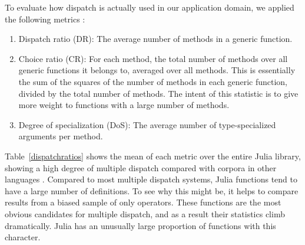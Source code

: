 To evaluate how dispatch is actually used in our application domain,
we applied the following metrics \cite{multipledispatch}:

\begin{enumerate}
\item Dispatch ratio (DR): The average number of methods in a generic function.
\item Choice ratio (CR): For each method, the total number of methods over all
generic functions it belongs to, averaged over all methods.
This is essentially the sum of the squares of the number of methods in each
generic function, divided by the total number of methods.
The intent of this statistic is to give more weight to functions with a large
number of methods.
\item Degree of specialization (DoS): The average number of type-specialized
arguments per method.
\end{enumerate}

Table~\ref{dispatchratios} shows the mean of each metric over the entire Julia
 library, showing a high degree of multiple dispatch compared with
corpora in other languages \cite{multipledispatch}.
Compared to most multiple dispatch systems, Julia functions tend to have a large
number of definitions.
To see why this might be, it helps to compare results from a biased sample of
only operators.
These functions are the most obvious candidates for multiple dispatch, and as
a result their statistics climb dramatically.
Julia has an unusually large proportion of functions with this character.
